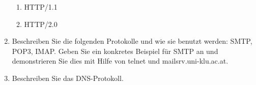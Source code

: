 \documentclass[11pt]{article}
\begin{document}
\begin{enumerate}[\thesection .1]
\begin{enumerate}[$\diamond$]
        \item HTTP/1.1
        \item HTTP/2.0


    \end{enumerate}

    \item Beschreiben Sie die folgenden Protokolle und wie sie benutzt werden: SMTP,
POP3, IMAP. Geben Sie ein konkretes Beispiel für SMTP an und demonstrieren
Sie dies mit Hilfe von telnet und mailsrv.uni-klu.ac.at.
    \item Beschreiben Sie das DNS-Protokoll.
\end{enumerate}
\end{document}
